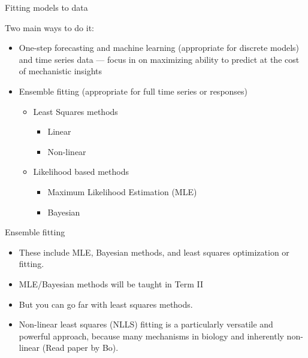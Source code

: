 \documentclass[xcolor=x11names,handout,compress]{beamer}
\renewcommand{\(}{\begin{columns}}
\renewcommand{\)}{\end{columns}}
\newcommand{\<}[1]{\begin{column}{#1}}
\renewcommand{\>}{\end{column}}
\begin{document}
\begin{frame}{Fitting models to data}

Two main ways to do it:

\begin{itemize}\itemsep10pt

	\item One-step forecasting and machine learning (appropriate for discrete models) and time 
	series data --- focus in on maximizing ability to predict at the cost of mechanistic insights 

	\item Ensemble fitting (appropriate for full time series or responses)
	\begin{itemize}
	\item Least Squares methods
	\begin{itemize}
	 \item Linear 
	 \item Non-linear
	\end{itemize}
	\item Likelihood based methods 
	\begin{itemize}
	 \item Maximum Likelihood Estimation (MLE) 
	 \item Bayesian
	\end{itemize}

	\end{itemize}
	
\end{itemize}

\end{frame}

\begin{frame}{Ensemble fitting}

\begin{itemize}
	
\item These include MLE, Bayesian methods, and least squares optimization or fitting. 

\item MLE/Bayesian methods will be taught in Term II

\item But you can go far with least squares methods.

\item Non-linear least squares (NLLS) fitting is a particularly versatile and powerful approach, because many mechanisms in biology and inherently non-linear (Read paper by Bo).  

\end{itemize}

\end{frame}
\end{document}
